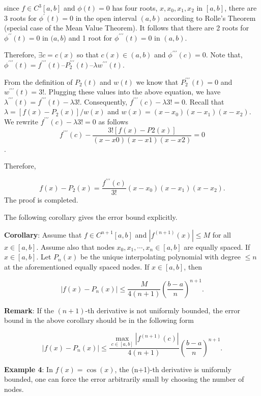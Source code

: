 \documentclass[
]{book}
\begin{document}
since \(f\in C^3[a,b]\) and \(\phi (t) = 0\) has four roots, \(x, x_0, x_1, x_2\) in \([a, b]\), there are 3 roots for \(\phi^\prime(t) = 0\) in the open interval \((a, b)\) according to Rolle's Theorem (special case of the Mean Value Theorem). It follows that there are 2 roots for \(\phi^{\prime\prime}(t) = 0\) in \((a, b\)) and 1 root for \(\phi^{\prime\prime\prime}(t)=0\) in \((a, b)\).

Therefore, \(\exists c = c(x)\) so that \(c(x) \in (a,b)\) and \(\phi^{\prime\prime\prime}(c) = 0\). Note that, \(\phi^{\prime\prime\prime}(t) = f^{\prime\prime\prime}(t) – P_2^{\prime\prime\prime}(t) – \lambda w^{\prime\prime\prime}(t)\).

From the definition of \(P_2(t)\) and \(w(t)\) we know that \(P_2^{\prime\prime\prime}(t) =0\) and \(w^{\prime\prime\prime}(t) = 3!\). Plugging these values into the above equation, we have \(\lambda^{\prime\prime\prime}(t)=f^{\prime\prime\prime}(t) - \lambda 3!\). Consequently, \(f^{\prime\prime\prime}(c) - \lambda 3! =0\). Recall that \(\lambda = [f(x) - P_2(x)]/w(x)\) and \(w(x) = (x - x_0)(x - x_1)(x - x_2)\). We rewrite \(f^{\prime\prime\prime}(c) - \lambda 3! =0\) as follows
\[
f^{\prime\prime\prime}(c) - \frac{3![f(x) - P2(x)]}{(x - x0)(x - x1)(x - x2)} = 0
\].

Therefore,

\[
f(x) - P_2(x) = \frac{f^{\prime\prime\prime}(c) }{3!}(x - x_0)(x - x_1)(x - x_2).
\]
The proof is completed.

The following corollary gives the error bound explicitly.

\textbf{Corollary}: Assume that \(f \in C^{n+1}[a, b]\) and \(|f^{(n+1)}(x)| \le M\) for all \(x \in [a, b]\). Assume also that nodes \(x_0, x_1, \cdots , x_n \in [a, b]\) are equally spaced. If \(x \in [a, b]\). Let \(P_n(x)\) be the unique interpolating polynomial with degree \(\le n\) at the aforementioned equally spaced nodes. If \(x \in [a, b]\), then

\[
|f(x) - P_n(x)|\le \frac{M}{4(n+1)}\left(\frac{b-a}{n} \right)^{n+1}.
\]

\textbf{Remark}: If the \((n+1)\)-th derivative is not uniformly bounded, the error bound in the above corollary should be in the following form

\[
|f(x) - P_n(x)|\le \frac{\max_{c\in [a,b]}|f^{(n+1)}(c)|}{4(n+1)}\left(\frac{b-a}{n} \right)^{n+1}.
\]

\textbf{Example 4}: In \(f(x) = \cos(x)\), the (n+1)-th derivative is uniformly bounded, one can force the error arbitrarily small by choosing the number of nodes.
\end{document}
